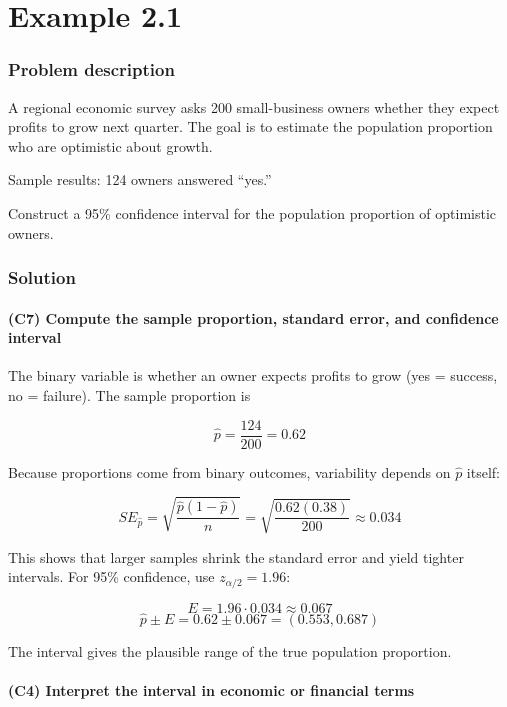 \chapter{Example 2.1}\label{sec:interval-example2-1}

\subsection{Problem description}\label{subsec:interval-example2-1-problem}

A regional economic survey asks 200 small-business owners whether they expect profits to grow next quarter. The goal is to estimate the population proportion who are optimistic about growth.

Sample results: 124 owners answered ``yes.''

Construct a 95\% confidence interval for the population proportion of optimistic owners.

\subsection{Solution}\label{subsec:interval-example2-1-solution}

\subsubsection{(C7) Compute the sample proportion, standard error, and confidence interval}\label{subsubsec:interval-example2-1-c7}

The binary variable is whether an owner expects profits to grow (yes = success, no = failure). The sample proportion is

\[
\hat{p} = \frac{124}{200} = 0.62
\]

Because proportions come from binary outcomes, variability depends on \(\hat{p}\) itself:

\[
SE_{\hat{p}} = \sqrt{\frac{\hat{p}(1 - \hat{p})}{n}} = \sqrt{\frac{0.62(0.38)}{200}} \approx 0.034
\]

This shows that larger samples shrink the standard error and yield tighter intervals. For 95\% confidence, use \(z_{\alpha/2} = 1.96\):

\[
E = 1.96 \cdot 0.034 \approx 0.067
\]
\[
\hat{p} \pm E = 0.62 \pm 0.067 = (0.553, 0.687)
\]

The interval gives the plausible range of the true population proportion.

\subsubsection{(C4) Interpret the interval in economic or financial terms}\label{subsubsec:interval-example2-1-c4}

